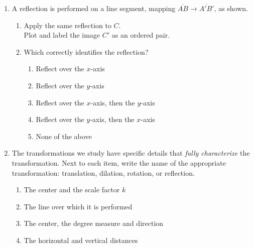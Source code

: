 \documentclass[12pt, twoside]{article}
\begin{document}
\begin{enumerate}
\newpage
\item A reflection is performed on a line segment, mapping $\overline{AB} \rightarrow \overline{A'B'}$, as shown.
\begin{multicols}{2}
  \begin{enumerate}
    \item Apply the same reflection to $C$. \\
    Plot and label the image $C'$ as an ordered pair.
    \item Which correctly identifies the reflection?
    \begin{enumerate}[label=(\Alph*)]
      \item Reflect over the $x$-axis
      \item Reflect over the $y$-axis
      \item Reflect over the $x$-axis, then the $y$-axis
      \item Reflect over the $y$-axis, then the $x$-axis
      \item None of the above
    \end{enumerate} \vspace{2cm}
    \end{enumerate}
    \begin{flushright}
    \end{flushright}
\end{multicols}


\newpage
\item The transformations we study have specific details that \emph{fully characterize} the transformation. Next to each item, write the name of the appropriate transformation: translation, dilation, rotation, or reflection.
\begin{enumerate}[itemsep=0.5cm]
  \item The center and the scale factor $k$
  \item The line over which it is performed
  \item The center, the degree measure and direction
  \item The horizontal and vertical distances
\end{enumerate}


\end{enumerate}
\end{document}
